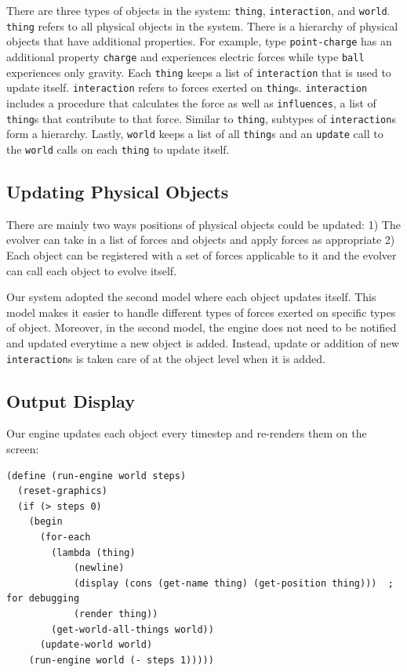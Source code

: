 \documentclass{article}
\begin{document}
There are three types of objects in the system: \texttt{thing},
\texttt{interaction}, and \texttt{world}. \texttt{thing} refers to all physical
objects in the system. There is a hierarchy of physical objects that have
additional properties. For example, type \texttt{point-charge} has an
additional property \texttt{charge} and experiences electric forces while type
\texttt{ball} experiences only gravity. Each \texttt{thing} keeps a list of
\texttt{interaction} that is used to update itself. \texttt{interaction} refers
to forces exerted on \texttt{thing}s. \texttt{interaction} includes a procedure
that calculates the force as well as \texttt{influences}, a list of
\texttt{thing}s that contribute to that force. Similar to \texttt{thing},
subtypes of \texttt{interaction}s form a hierarchy. Lastly, \texttt{world}
keeps a list of all \texttt{thing}s and an \texttt{update} call to the
\texttt{world} calls on each \texttt{thing} to update itself.


\subsection{Updating Physical Objects}

There are mainly two ways positions of physical objects could be updated: 1)
The evolver can take in a list of forces and objects and apply forces as
appropriate 2) Each object can be registered with a set of forces applicable to
it and the evolver can call each object to evolve itself.

Our system adopted the second model where each object updates itself. This
model makes it easier to handle different types of forces exerted on specific
types of object. Moreover, in the second model, the engine does not need to be
notified and updated everytime a new object is added. Instead, update or
addition of new \texttt{interaction}s is taken care of at the object level when
it is added.


\subsection{Output Display}

Our engine updates each object every timestep and re-renders them on the
screen:

\begin{verbatim}
(define (run-engine world steps)
  (reset-graphics)
  (if (> steps 0)
    (begin 
      (for-each 
        (lambda (thing)
            (newline)
            (display (cons (get-name thing) (get-position thing)))  ; for debugging
            (render thing))
        (get-world-all-things world))
      (update-world world)
    (run-engine world (- steps 1)))))
\end{verbatim}
\end{document}
